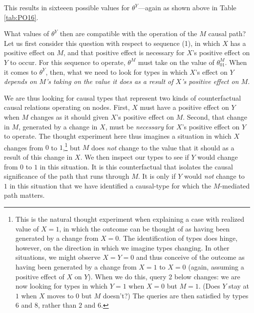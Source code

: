 \documentclass[12pt,]{book}
\let\rmarkdownfootnote\footnote%
\def\footnote{\protect\rmarkdownfootnote}
\begin{document}
This results in sixteeen possible values for \(\theta^Y\)---again as shown above in Table \ref{tab:PO16}.

What values of \(\theta^Y\)
then are compatible with the operation of the \(M\) causal path? Let us first consider this question with respect to sequence (1), in which \(X\) has a positive effect on \(M\), and that positive effect is necessary for \(X\)'s positive effect on \(Y\) to occur. For this sequence to operate, \(\theta^M\) must take on the value of \(\theta^M_{01}\). When it comes to \(\theta^Y\), then, what we need to look for types in which \(X\)'s effect on \(Y\) \emph{depends on \(M\)'s taking on the value it does as a result of \(X\)'s positive effect on \(M\)}.

We are thus looking for causal types that represent two kinds of counterfactual causal relations operating on nodes. First, \(X\) must have a positive effect on \(Y\) when \(M\) changes as it should given \(X\)'s positive effect on \(M\). Second, that change in \(M\), generated by a change in \(X\), must be \emph{necessary} for \(X\)'s positive effect on \(Y\) to operate. The thought experiment here thus imagines a situation in which \(X\) changes from \(0\) to \(1\),\footnote{This is the natural thought experiment when explaining a case with realized value of \(X=1\), in which the outcome can be thought of as having been generated by a change from \(X=0\). The identification of types does hinge, however, on the direction in which we imagine types changing. In other situations, we might observe \(X=Y=0\) and thus conceive of the outcome as having been generated by a change from \(X=1\) to \(X=0\) (again, assuming a positive effect of \(X\) on \(Y\)). When we do this, query 2 below changes: we are now looking for types in which \(Y=1\) when \(X=0\) but \(M=1\). (Does \(Y\) stay at \(1\) when \(X\) moves to \(0\) but \(M\) doesn't?) The queries are then satisfied by types \(6\) and \(8\), rather than \(2\) and \(6\).} but \(M\) does \emph{not} change to the value that it should as a result of this change in \(X\). We then inspect our types to see if \(Y\) would change from \(0\) to \(1\) in this situation. It is this counterfactual that isolates the causal significance of the path that runs through \(M\). It is only if \(Y\) would \emph{not} change to \(1\) in this situation that we have identified a causal-type for which the \(M\)-mediated path matters.
\end{document}
